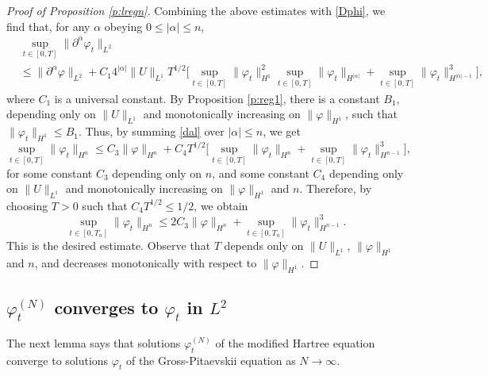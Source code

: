 \documentclass[11pt,a4paper,DIV11]{scrartcl}	%
\newcommand{\ph}{\varphi_t^{(N)}}	%
\begin{document}
\begin{proof}[Proof of Proposition \ref{p:lregn}]
  
  Combining the above estimates with \eqref{Dphi}, we find that, for any
  $\alpha$ obeying $0 \le |\alpha| \le n$,
  \begin{equation} \label{dal}
    \begin{split}
      & \sup_{t \in [0,T]} \| \partial^\alpha \varphi_t \|_{L^2} \\
      & \le \| \partial^\alpha \varphi \|_{L^2} + C_1 4^{|\alpha|} \| U
      \|_{L^1} T^{1/2} \Big[ \sup_{t \in [0,T]} \| \varphi_t \|_{H^1}^2
      \sup_{t \in [0,T]} \| \varphi_t \|_{H^{|\alpha|}} + \sup_{t \in [0,T]}
      \| \varphi_t \|_{H^{|\alpha|-1}}^3 \Big],
    \end{split}
  \end{equation}
  where $C_1$ is a universal constant. By Proposition \ref{p:reg1}, there is a
  constant $B_1$, depending only on $\| U \|_{L^1}$ and monotonically
  increasing on $\| \varphi \|_{H^1}$, such that $\| \varphi_t \|_{H^1} \le
  B_1$. Thus, by summing \eqref{dal} over $|\alpha| \le n$, we get
  \[
    \sup_{t \in [0,T]} \| \varphi_t \|_{H^n} \le C_3 \| \varphi \|_{H^n} +
    C_4 T^{1/2} \Big[ \sup_{t \in [0,T]} \| \varphi_t \|_{H^n} + \sup_{t \in
    [0,T]} \| \varphi_t \|_{H^{n-1}}^3 \Big],
  \]
  for some constant $C_3$ depending only on $n$, and some constant $C_4$
  depending only on $\| U \|_{L^1}$ and monotonically increasing on $\|
  \varphi \|_{H^1}$ and $n$. Therefore, by choosing $T > 0$ such that $C_4
  T^{1/2} \le 1/2$, we obtain
  \[
    \sup_{t \in [0,T_n]} \| \varphi_t \|_{H^n} \le 2 C_3 \| \varphi \|_{H^n}
    + \sup_{t \in [0,T_n]} \| \varphi_t \|_{H^{n-1}}^3.
  \]
  This is the desired estimate. Observe that $T$ depends only on $\| U
  \|_{L^1}$, $\| \varphi \|_{H^1}$ and $n$, and decreases monotonically with
  respect to $\| \varphi \|_{H^1}$.
\end{proof}


\subsection{$\ph$ converges to $\varphi_t$ in $L^2$}


The next lemma says that solutions $\varphi_t^{(N)}$ of the modified Hartree
equation converge to solutions $\varphi_t$ of the Gross-Pitaevskii equation
as $N \to \infty$.
\end{document}

